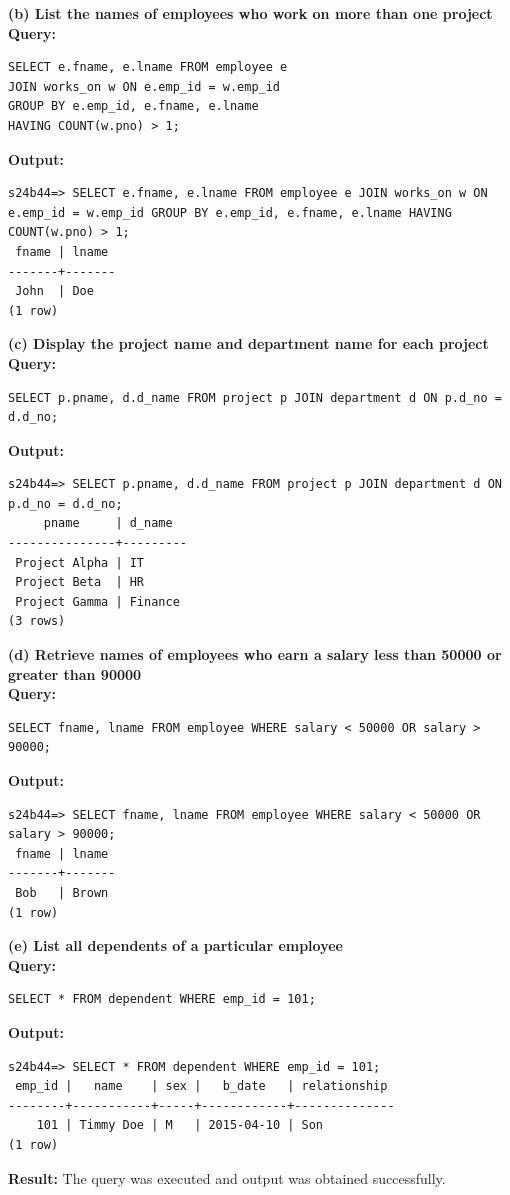 \documentclass[12pt, a4paper]{article}
\begin{document}
\textbf{(b) List the names of employees who work on more than one project}\\
\textbf{Query:}
\begin{lstlisting}
SELECT e.fname, e.lname FROM employee e 
JOIN works_on w ON e.emp_id = w.emp_id 
GROUP BY e.emp_id, e.fname, e.lname 
HAVING COUNT(w.pno) > 1;
\end{lstlisting}
\textbf{Output:}
\begin{lstlisting}[style=terminal]
s24b44=> SELECT e.fname, e.lname FROM employee e JOIN works_on w ON e.emp_id = w.emp_id GROUP BY e.emp_id, e.fname, e.lname HAVING COUNT(w.pno) > 1;
 fname | lname 
-------+-------
 John  | Doe
(1 row)
\end{lstlisting}

\textbf{(c) Display the project name and department name for each project}\\
\textbf{Query:}
\begin{lstlisting}
SELECT p.pname, d.d_name FROM project p JOIN department d ON p.d_no = d.d_no;
\end{lstlisting}
\textbf{Output:}
\begin{lstlisting}[style=terminal]
s24b44=> SELECT p.pname, d.d_name FROM project p JOIN department d ON p.d_no = d.d_no;
     pname     | d_name  
---------------+---------
 Project Alpha | IT
 Project Beta  | HR
 Project Gamma | Finance
(3 rows)
\end{lstlisting}

\textbf{(d) Retrieve names of employees who earn a salary less than 50000 or greater than 90000}\\
\textbf{Query:}
\begin{lstlisting}
SELECT fname, lname FROM employee WHERE salary < 50000 OR salary > 90000;
\end{lstlisting}
\textbf{Output:}
\begin{lstlisting}[style=terminal]
s24b44=> SELECT fname, lname FROM employee WHERE salary < 50000 OR salary > 90000;
 fname | lname 
-------+-------
 Bob   | Brown
(1 row)
\end{lstlisting}

\textbf{(e) List all dependents of a particular employee}\\
\textbf{Query:}
\begin{lstlisting}
SELECT * FROM dependent WHERE emp_id = 101;
\end{lstlisting}
\textbf{Output:}
\begin{lstlisting}[style=terminal]
s24b44=> SELECT * FROM dependent WHERE emp_id = 101;
 emp_id |   name    | sex |   b_date   | relationship 
--------+-----------+-----+------------+--------------
    101 | Timmy Doe | M   | 2015-04-10 | Son
(1 row)
\end{lstlisting}
\textbf{Result:} The query was executed and output was obtained successfully.
\end{document}
